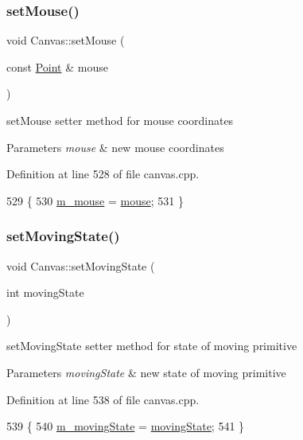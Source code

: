 \subsubsection{\texorpdfstring{set\+Mouse()}{setMouse()}}
{\footnotesize\ttfamily void Canvas\+::set\+Mouse (\begin{DoxyParamCaption}\item[{const \hyperlink{class_point}{Point} \&}]{mouse }\end{DoxyParamCaption})}



set\+Mouse setter method for mouse coordinates 


\begin{DoxyParams}{Parameters}
{\em mouse} & new mouse coordinates \\
\hline
\end{DoxyParams}


Definition at line 528 of file canvas.\+cpp.


\begin{DoxyCode}
529 \{
530     \hyperlink{class_canvas_a37d2fd203dc21501aee37001e49789b1}{m\_mouse} = \hyperlink{class_canvas_a5c78c7a84c0f9d5540caeab66b677299}{mouse};
531 \}
\end{DoxyCode}
\mbox{\label{class_canvas_a3ec03d6ae21250fcc0b0a3164f701933}} 
\subsubsection{\texorpdfstring{set\+Moving\+State()}{setMovingState()}}
{\footnotesize\ttfamily void Canvas\+::set\+Moving\+State (\begin{DoxyParamCaption}\item[{int}]{moving\+State }\end{DoxyParamCaption})}



set\+Moving\+State setter method for state of moving primitive 


\begin{DoxyParams}{Parameters}
{\em moving\+State} & new state of moving primitive \\
\hline
\end{DoxyParams}


Definition at line 538 of file canvas.\+cpp.


\begin{DoxyCode}
539 \{
540     \hyperlink{class_canvas_a0d0f98258b42bd7b40f175baf3f1220a}{m\_movingState} = \hyperlink{class_canvas_a8097ff7e44fb5fecf0dd0997e13e4c32}{movingState};
541 \}
\end{DoxyCode}
\mbox{\label{class_canvas_a6c42c7c65e5eae64c4fa1839146f0440}} 
